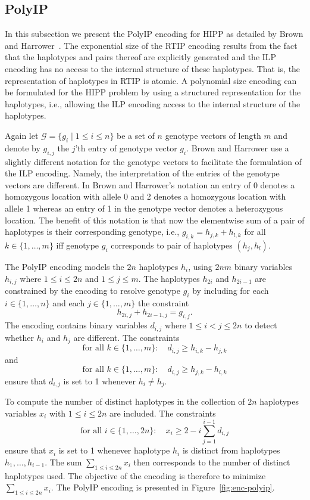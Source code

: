 \documentclass[12pt,a4paper]{article}
\begin{document}
\subsection{PolyIP}
In this subsection we present the PolyIP encoding for HIPP as detailed by Brown and Harrower~\cite{DBLP:journals/tcbb/BrownH06}.
The exponential size of the RTIP encoding results from the fact that the haplotypes and pairs thereof are explicitly generated and the ILP encoding has no access to the internal structure of these haplotypes.
That is, the representation of haplotypes in RTIP is atomic.
A polynomial size encoding can be formulated for the HIPP problem by using a structured representation for the haplotypes, i.e., allowing the ILP encoding access to the internal structure of the haplotypes.

Again let $\mathcal{G}=\{g_i\mid 1\leq i \leq n\}$ be a set of $n$ genotype vectors of length $m$ and denote by $g_{i,j}$ the $j$'th entry of genotype vector $g_i$.
Brown and Harrower use a slightly different notation for the genotype vectors to facilitate the formulation of the ILP encoding.
Namely, the interpretation of the entries of the genotype vectors are different.
In Brown and Harrower's notation an entry of 0 denotes a homozygous location with allele 0 and 2 denotes a homozygous location with allele 1 whereas 
an entry of 1 in the genotype vector denotes a heterozygous location.
The benefit of this notation is that now the elementwise sum of a pair of haplotypes is their corresponding genotype, i.e., $g_{i,k} = h_{j, k} + h_{l, k}$ for all $k\in\{1,\dots ,m\}$ iff genotype $g_i$ corresponds to pair of haplotypes $(h_{j}, h_{l})$.

The PolyIP encoding models the $2n$ haplotypes $h_i$, using $2nm$ binary variables $h_{i,j}$ where $1\leq i \leq 2n$ and $1\leq j \leq m$.
The haplotypes $h_{2i}$ and $h_{2i-1}$ are constrained by the encoding to resolve genotype $g_i$ by including for each $i\in\{1, \dots , n\}$ and each $j\in\{1,\dots ,m\}$ the constraint
$$ h_{2i,j} + h_{2i-1,j} = g_{i,j}. $$
The encoding contains binary variables $d_{i,j}$ where $1\leq i<j\leq 2n$ to detect whether $h_i$ and $h_j$ are different.
The constraints 
$$ \text{for all }k\in\{1,\dots ,m\}:\quad  d_{i,j} \geq h_{i,k}-h_{j,k} $$
and
$$ \text{for all }k\in\{1,\dots ,m\}:\quad  d_{i,j} \geq h_{j,k}-h_{i,k} $$
ensure that $d_{i,j}$ is set to 1 whenever $h_i\neq h_j$.

To compute the number of distinct haplotypes in the collection of $2n$ haplotypes variables $x_i$ with $1\leq i\leq 2n$ are included.
The constraints
$$ \text{for all }i\in\{1,\dots ,2n\}:\quad  x_{i} \geq 2 - i \sum_{j=1}^{i-1} d_{i,j} $$
ensure that $x_i$ is set to 1 whenever haplotype $h_i$ is distinct from haplotypes $h_1,\dots , h_{i-1}$.
The sum $\sum_{1\leq i\leq 2n} x_i$ then corresponds to the number of distinct haplotypes used.
The objective of the encoding is therefore to minimize $\sum_{1\leq i\leq 2n} x_i$.
The PolyIP encoding is presented in Figure~\ref{fig:enc-polyip}.
\end{document}
